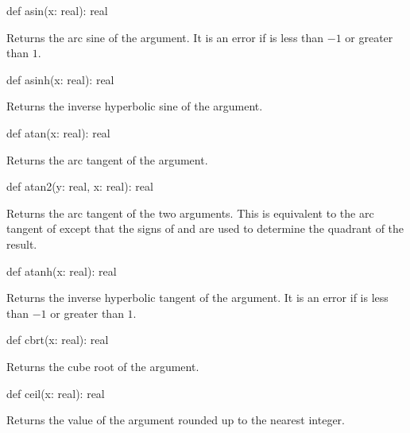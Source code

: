 \begin{protohead}
def asin(x: real): real
\end{protohead}
\begin{protobody}
Returns the arc sine of the argument.  It is an error if  is
less than $-1$ or greater than $1$.
\end{protobody}

\begin{protohead}
def asinh(x: real): real
\end{protohead}
\begin{protobody}
Returns the inverse hyperbolic sine of the argument.
\end{protobody}

\begin{protohead}
def atan(x: real): real
\end{protohead}
\begin{protobody}
Returns the arc tangent of the argument.
\end{protobody}

\begin{protohead}
def atan2(y: real, x: real): real
\end{protohead}
\begin{protobody}
Returns the arc tangent of the two arguments.  This is equivalent to
the arc tangent of  except that the signs of 
and  are used to determine the quadrant of the result.
\end{protobody}

\begin{protohead}
def atanh(x: real): real
\end{protohead}
\begin{protobody}
Returns the inverse hyperbolic tangent of the argument.  It is an error
if  is less than $-1$ or greater than $1$.
\end{protobody}

\begin{protohead}
def cbrt(x: real): real
\end{protohead}
\begin{protobody}
Returns the cube root of the argument.
\end{protobody}

\begin{protohead}
def ceil(x: real): real
\end{protohead}
\begin{protobody}
Returns the value of the argument rounded up to the nearest integer.
\end{protobody}

